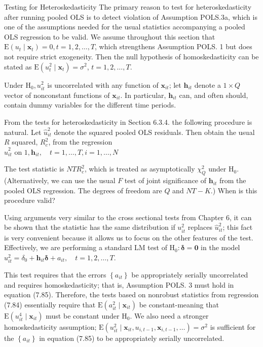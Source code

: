 \documentclass[10pt]{article}
\begin{document}
Testing for Heteroskedasticity The primary reason to test for heteroskedasticity after running pooled OLS is to detect violation of Assumption POLS.3a, which is one of the assumptions needed for the usual statistics accompanying a pooled OLS regression to be valid. We assume throughout this section that $\mathrm{E}\left(u_{t} \mid \mathbf{x}_{t}\right)=0, t= 1,2, \ldots, T$, which strengthens Assumption POLS. 1 but does not require strict exogeneity. Then the null hypothesis of homoskedasticity can be stated as $\mathrm{E}\left(u_{t}^{2} \mid \mathbf{x}_{t}\right)=\sigma^{2}$, $t=1,2, \ldots, T$.

Under $\mathrm{H}_{0}, u_{i t}^{2}$ is uncorrelated with any function of $\mathbf{x}_{i t}$; let $\mathbf{h}_{i t}$ denote a $1 \times Q$ vector of nonconstant functions of $\mathbf{x}_{i t}$. In particular, $\mathbf{h}_{i t}$ can, and often should, contain dummy variables for the different time periods.

From the tests for heteroskedasticity in Section 6.3.4. the following procedure is natural. Let $\hat{u}_{i t}^{2}$ denote the squared pooled OLS residuals. Then obtain the usual $R$ squared, $R_{c}^{2}$, from the regression\\
$\hat{u}_{i t}^{2}$ on $1, \mathbf{h}_{i t}, \quad t=1, \ldots, T, i=1, \ldots, N$

The test statistic is $N T R_{c}^{2}$, which is treated as asymptotically $\chi_{Q}^{2}$ under $\mathrm{H}_{0}$. (Alternatively, we can use the usual $F$ test of joint significance of $\mathbf{h}_{i t}$ from the pooled OLS regression. The degrees of freedom are $Q$ and $N T-K$.) When is this procedure valid?

Using arguments very similar to the cross sectional tests from Chapter 6, it can be shown that the statistic has the same distribution if $u_{i t}^{2}$ replaces $\hat{u}_{i t}^{2}$; this fact is very convenient because it allows us to focus on the other features of the test. Effectively, we are performing a standard LM test of $\mathrm{H}_{0}: \boldsymbol{\delta}=\mathbf{0}$ in the model\\
$u_{i t}^{2}=\delta_{0}+\mathbf{h}_{i t} \boldsymbol{\delta}+a_{i t}, \quad t=1,2, \ldots, T$.

This test requires that the errors $\left\{a_{i t}\right\}$ be appropriately serially uncorrelated and requires homoskedasticity; that is, Assumption POLS. 3 must hold in equation (7.85). Therefore, the tests based on nonrobust statistics from regression (7.84) essentially require that $\mathrm{E}\left(a_{i t}^{2} \mid \mathbf{x}_{i t}\right)$ be constant-meaning that $\mathrm{E}\left(u_{i t}^{4} \mid \mathbf{x}_{i t}\right)$ must be constant under $\mathrm{H}_{0}$. We also need a stronger homoskedasticity assumption; $\mathrm{E}\left(u_{i t}^{2} \mid \mathbf{x}_{i t}, u_{i, t-1}, \mathbf{x}_{i, t-1}, \ldots\right)= \sigma^{2}$ is sufficient for the $\left\{a_{i t}\right\}$ in equation (7.85) to be appropriately serially uncorrelated.
\end{document}

